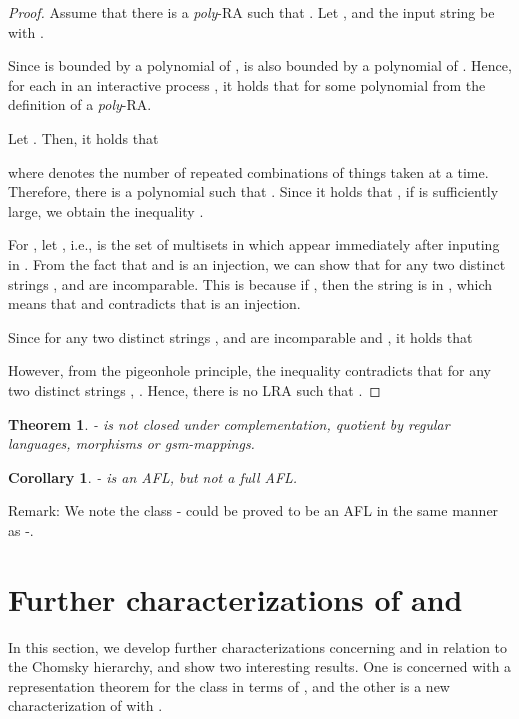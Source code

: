 \documentclass[preprint,fleqn,1p]{elsarticle}
\newtheorem{thm}{Theorem}
\newtheorem{cor}{Corollary}
\begin{document}
\begin{proof}
Assume that there is a {\it poly}-RA  such that .  Let ,  and the input string be  with . 

Since  is bounded by a polynomial of ,  is also bounded by a polynomial of .  Hence, for each  in an interactive process , it holds that  for some polynomial  from the definition of a {\it poly}-RA.

Let . Then, it holds that

where  denotes the number of repeated combinations of  things taken  at a time. Therefore, there is a polynomial  such that . Since it holds that , if  is sufficiently large,  we obtain the inequality . 

For , let , i.e.,  is the set of multisets in  which appear immediately after inputing  in . From the fact that  and  is an injection, we can show that for any two distinct strings ,  and  are incomparable. This is because if , then the string  is in , which means that  and contradicts that  is an injection. 

Since for any two distinct strings ,  and  are incomparable and , it holds that 

However, from the pigeonhole principle, the inequality  contradicts that for any two distinct strings , . Hence, there is no LRA  such that .
\end{proof}

\begin{thm}
- is not closed under complementation, quotient by regular languages, morphisms or gsm-mappings.
\end{thm}

\begin{cor}
- is an AFL, but not a full AFL.
\end{cor}

\begin{flushleft}
Remark: We note the class - could be proved to be an AFL in the same manner as -.
\end{flushleft}

\section{Further characterizations of  and }

In this section, we develop further characterizations concerning  and  in relation to the Chomsky hierarchy, and show two interesting results. One is concerned with a representation theorem for the class  in terms of , and the other is a new characterization of  with .  
\end{document}
